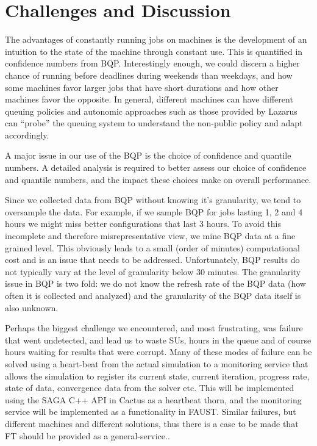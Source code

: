 \documentclass[conference,final]{IEEEtran}
\newcommand{\jhanote}[1]{ {\textcolor{red} { ***Jha: #1 }}}
\newcommand{\jhanote}[1]{}
\begin{document}


\section{Challenges and Discussion}

The advantages of constantly running jobs on machines is the
development of an intuition to the state of the machine through
constant use. This is quantified in confidence numbers from
BQP. Interestingly enough, we could discern a higher chance of running
before deadlines during weekends than weekdays, and how some machines
favor larger jobs that have short durations and how other machines
favor the opposite. In general, different machines can have different
queuing policies and autonomic approaches such as those provided by
Lazarus can ``probe'' the queuing system to understand the non-public
policy and adapt accordingly.

A major issue in our use of the BQP is the choice of confidence and
quantile numbers. A detailed analysis is required to better assess our
choice of confidence and quantile numbers, and the impact these choices
make on overall performance.

Since we collected data from BQP without knowing it's granularity, we
tend to oversample the data. For example, if we sample BQP for jobs
lasting 1, 2 and 4 hours we might miss better configurations that last
3 hours. To avoid this incomplete and therefore misrepresentative
view, we mine BQP data at a fine grained level. This obviously leads
to a small (order of minutes) computational cost and is an issue that
needs to be addressed. Unfortunately, BQP results do not typically
vary at the level of granularity below 30 minutes. The granularity
issue in BQP is two fold: we do not know the refresh rate of
the BQP data (how often it is collected and analyzed) and the granularity
of the BQP data itself is also unknown.

Perhaps the biggest challenge we encountered, and most frustrating,
was failure that went undetected, and lead us to waste SUs, hours in
the queue and of course hours waiting for results that were
corrupt. Many of these modes of failure can be solved using a
heart-beat from the actual simulation to a monitoring service that
allows the simulation to register its current state, current
iteration, progress rate, state of data, convergence data from the
solver etc. This will be implemented using the SAGA C++ API in Cactus
as a heartbeat thorn, and the monitoring service will be implemented
as a functionality in FAUST.  Similar failures, but different machines
and different solutions, thus there is a case to be made that FT
should be provided as a general-service..
\end{document}
